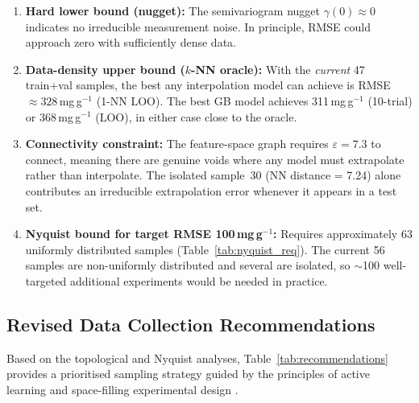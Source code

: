 \documentclass[12pt,a4paper]{article}
\begin{document}
\begin{enumerate}[leftmargin=*]
  \item \textbf{Hard lower bound (nugget):} The semivariogram nugget
        $\gamma(0) \approx 0$ indicates no irreducible measurement noise.
        In principle, RMSE could approach zero with sufficiently dense
        data.
  \item \textbf{Data-density upper bound ($k$-NN oracle):}
        With the \emph{current} 47 train+val samples, the best any
        interpolation model can achieve is RMSE $\approx 328$\,mg\,g$^{-1}$
        (1-NN LOO).  The best GB model achieves 311\,mg\,g$^{-1}$ (10-trial)
        or 368\,mg\,g$^{-1}$ (LOO), in either case close to the oracle.
  \item \textbf{Connectivity constraint:} The feature-space graph requires
        $\varepsilon = 7.3$ to connect, meaning there are genuine voids
        where any model must extrapolate rather than interpolate.  The
        isolated sample~30 (NN distance = 7.24) alone contributes an
        irreducible extrapolation error whenever it appears in a test set.
  \item \textbf{Nyquist bound for target RMSE 100\,mg\,g$^{-1}$:} Requires
        approximately 63 uniformly distributed samples (Table~\ref{tab:nyquist_req}).
        The current 56 samples are non-uniformly distributed and several
        are isolated, so $\sim$100 well-targeted additional experiments
        would be needed in practice.
\end{enumerate}

\subsection{Revised Data Collection Recommendations}

Based on the topological and Nyquist analyses, Table~\ref{tab:recommendations}
provides a prioritised sampling strategy guided by the principles of
active learning \citep{Settles2012} and space-filling experimental design
\citep{McKay1979, Pronzato2012}.
\end{document}

